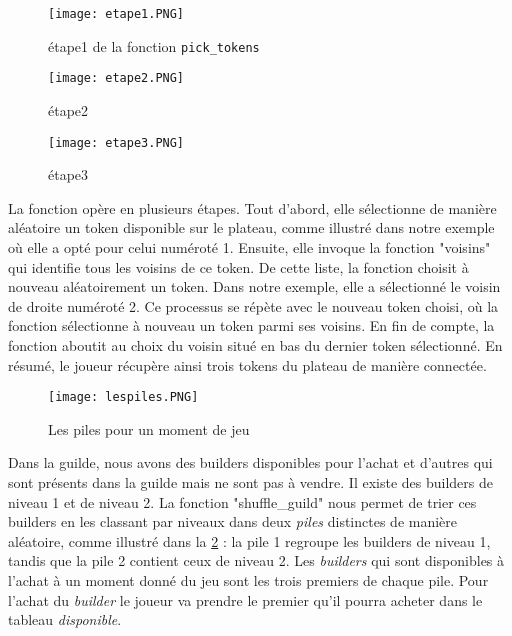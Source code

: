 \documentclass{article}
\begin{document}
\begin{figure}[ht]
  \begin{minipage}[b]{0.5\linewidth}
    \centering
    \texttt{[image: etape1.PNG]}
    \caption{étape1 de la fonction \texttt{pick\_tokens}}
    \label{fig:etape1}
  \end{minipage}
  \hfill
  \vspace{1em}
  \begin{minipage}[b]{0.50\linewidth}
    \centering
    \texttt{[image: etape2.PNG]}
    \caption{étape2}
    \label{fig:etape2}
  \end{minipage}
  \hfill
  \begin{minipage}[b]{0.50\linewidth}
    \centering
    \texttt{[image: etape3.PNG]}
    \caption{étape3}
    \label{fig:etape3}
  \end{minipage}
\end{figure}
\hspace{1.5em}La fonction opère en plusieurs étapes. Tout d'abord, elle sélectionne de manière aléatoire un token disponible sur le plateau, comme illustré dans notre exemple où elle a opté pour celui numéroté 1. Ensuite, elle invoque la fonction "voisins" qui identifie tous les voisins de ce token. De cette liste, la fonction choisit à nouveau aléatoirement un token. Dans notre exemple, elle a sélectionné le voisin de droite numéroté 2. Ce processus se répète avec le nouveau token choisi, où la fonction sélectionne à nouveau un token parmi ses voisins. En fin de compte, la fonction aboutit au choix du voisin situé en bas du dernier token sélectionné. En résumé, le joueur récupère ainsi trois tokens du plateau de manière connectée.

\vspace{2em}
 
\begin{figure}[ht]
    \centering
    \texttt{[image: lespiles.PNG]}
    \caption{Les piles pour un moment de jeu}
    \label{fig:lespiles}
\end{figure}
 Dans la guilde, nous avons des  builders disponibles pour l'achat et d'autres qui sont présents dans la guilde mais ne sont pas à vendre. Il existe des builders de niveau 1 et de niveau 2. La fonction "shuffle\_guild" nous permet de trier ces builders en les classant par niveaux dans deux \emph{piles} distinctes de manière aléatoire, comme illustré dans la \ref{fig:lespiles} : la pile 1 regroupe les builders de niveau 1, tandis que la pile 2 contient ceux de niveau 2. Les \emph{builders} qui sont disponibles à l'achat à un moment donné du jeu sont les trois premiers de chaque pile. Pour l'achat du \emph{builder} le joueur va prendre le premier qu'il pourra acheter dans le tableau \emph{disponible}. 
\end{document}
